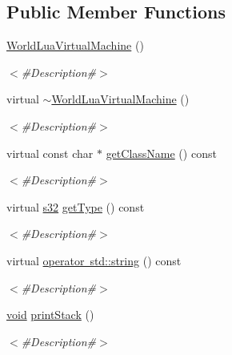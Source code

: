 \subsection*{Public Member Functions}
\begin{DoxyCompactItemize}
\item 
\mbox{\hyperlink{classnjli_1_1_world_lua_virtual_machine_aa8699ef660c3378db4bfbcc1914fc95a}{World\+Lua\+Virtual\+Machine}} ()
\begin{DoxyCompactList}\small\item\em $<$\#\+Description\#$>$ \end{DoxyCompactList}\item 
virtual \mbox{\hyperlink{classnjli_1_1_world_lua_virtual_machine_a688270d6bda8e9da30ce87cdba0b83bd}{$\sim$\+World\+Lua\+Virtual\+Machine}} ()
\begin{DoxyCompactList}\small\item\em $<$\#\+Description\#$>$ \end{DoxyCompactList}\item 
virtual const char $\ast$ \mbox{\hyperlink{classnjli_1_1_world_lua_virtual_machine_a8c957eaa6dffc96baccfa2d02e3f9bcf}{get\+Class\+Name}} () const
\begin{DoxyCompactList}\small\item\em $<$\#\+Description\#$>$ \end{DoxyCompactList}\item 
virtual \mbox{\hyperlink{_util_8h_aa62c75d314a0d1f37f79c4b73b2292e2}{s32}} \mbox{\hyperlink{classnjli_1_1_world_lua_virtual_machine_a59bdb7db8ae46e9bac0f928cb5115499}{get\+Type}} () const
\begin{DoxyCompactList}\small\item\em $<$\#\+Description\#$>$ \end{DoxyCompactList}\item 
virtual \mbox{\hyperlink{classnjli_1_1_world_lua_virtual_machine_a2103a96c08471f07dda2d3b118780018}{operator std\+::string}} () const
\begin{DoxyCompactList}\small\item\em $<$\#\+Description\#$>$ \end{DoxyCompactList}\item 
\mbox{\hyperlink{_thread_8h_af1e856da2e658414cb2456cb6f7ebc66}{void}} \mbox{\hyperlink{classnjli_1_1_world_lua_virtual_machine_a64ad43f3f5c5ce88f83a399116be7851}{print\+Stack}} ()
\begin{DoxyCompactList}\small\item\em $<$\#\+Description\#$>$ \end{DoxyCompactList}\item 

\end{DoxyCompactItemize}
